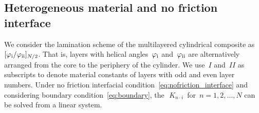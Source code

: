 \documentclass[preprint,12pt,times]{elsarticle}
\newcommand{\minus}[1]{\check{#1}}
\numberwithin{equation}{section}
\newcommand{\pr}[1]{\left( #1 \right)}
\newcommand{\p}{\,\textsf{\small pow}}
\newcommand{\msub}[2]{
\IfEqCase{#2}{
      {i}{\, m_{#1\cdot #2}\,}%
  }[\,m_{#1\cdot {\scriptscriptstyle #2}}\,]}
\newcommand{\gsub}[2]{g_{#1\cdot #2}}
\newcommand{\musub}[2]{\mu_{#1\cdot #2}}
\newcommand{\Ksub}[2]{\,K_{ {#1}\cdot {\scriptscriptstyle #2}}\,}
\newcommand{\RN}[1]{%
  \textup{\uppercase\expandafter{\romannumeral#1}}%
}
\renewcommand{\>}{$\Rightarrow$}
\begin{document}
\subsection{Heterogeneous material and no friction interface}
\label{sec:2mat_no_friction}
We consider the lamination scheme of the multilayered cylindrical composite as~$[\varphi_{\RN{1}}/\varphi_{\RN{2}}]_{N/2}$. That is, layers with helical angles~$\varphi_{\RN{1}}$ and~$\varphi_{\RN{2}}$ are alternatively arranged from the core to the periphery of the cylinder. We use~$I$ and~$II$ as subscripts to denote material constants of layers with odd and even layer numbers.
Under no friction interfacial condition~\eqref{eq:nofriction_interface} and considering boundary condition~\eqref{eq:boundary}, the~$\Ksub{n}{i}$ for~$n = 1,2,\dots,N$ can be solved from a linear system.
\end{document}
